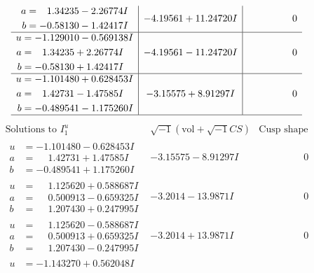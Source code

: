 \documentclass[1p]{elsarticle_modified}
\theoremstyle{definition}
\newcommand{\I}{\sqrt{-1}}
\begin{document}
$$\begin{array}{c|c|c}
\begin{aligned}
a &= \phantom{-}1.34235 - 2.26774 I \\
b &= -0.58130 - 1.42417 I\end{aligned}
 & -4.19561 + 11.24720 I & \phantom{-0.000000 } 0 \\ \hline\begin{aligned}
u &= -1.129010 - 0.569138 I \\
a &= \phantom{-}1.34235 + 2.26774 I \\
b &= -0.58130 + 1.42417 I\end{aligned}
 & -4.19561 - 11.24720 I & \phantom{-0.000000 } 0 \\ \hline\begin{aligned}
u &= -1.101480 + 0.628453 I \\
a &= \phantom{-}1.42731 - 1.47585 I \\
b &= -0.489541 - 1.175260 I\end{aligned}
 & -3.15575 + 8.91297 I & \phantom{-0.000000 } 0\\
 \hline 
 \end{array}$$\newpage$$\begin{array}{c|c|c}  
\text{Solutions to }I^u_{1}& \I (\text{vol} + \sqrt{-1}CS) & \text{Cusp shape}\\
 \hline 
\begin{aligned}
u &= -1.101480 - 0.628453 I \\
a &= \phantom{-}1.42731 + 1.47585 I \\
b &= -0.489541 + 1.175260 I\end{aligned}
 & -3.15575 - 8.91297 I & \phantom{-0.000000 } 0 \\ \hline\begin{aligned}
u &= \phantom{-}1.125620 + 0.588687 I \\
a &= \phantom{-}0.500913 - 0.659325 I \\
b &= \phantom{-}1.207430 + 0.247995 I\end{aligned}
 & -3.2014 - 13.9871 I & \phantom{-0.000000 } 0 \\ \hline\begin{aligned}
u &= \phantom{-}1.125620 - 0.588687 I \\
a &= \phantom{-}0.500913 + 0.659325 I \\
b &= \phantom{-}1.207430 - 0.247995 I\end{aligned}
 & -3.2014 + 13.9871 I & \phantom{-0.000000 } 0 \\ \hline\begin{aligned}
u &= -1.143270 + 0.562048 I \\

\end{aligned}
\end{array}$$
\end{document}
